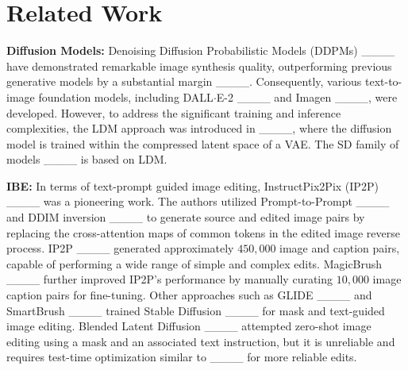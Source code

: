 \section{Related Work}
\label{sec:relatedwork}
\textbf{Diffusion Models:} Denoising Diffusion Probabilistic Models (DDPMs) ____ have demonstrated remarkable image synthesis quality, outperforming previous generative models by a substantial margin ____. Consequently, various text-to-image foundation models, including DALL$\cdot$E-2 ____ and Imagen ____, were developed. However, to address the significant training and inference complexities, the LDM approach was introduced in ____, where the diffusion model is trained within the compressed latent space of a VAE. The SD family of models ____ is based on LDM.

\textbf{IBE:} In terms of text-prompt guided image editing, InstructPix2Pix (IP2P) ____ was a pioneering work. The authors utilized Prompt-to-Prompt ____ and DDIM inversion ____ to generate source and edited image pairs by replacing the cross-attention maps of common tokens in the edited image reverse process. IP2P ____ generated approximately $450,000$ image and caption pairs, capable of performing a wide range of simple and complex edits. MagicBrush ____ further improved IP2P's performance by manually curating $10,000$ image caption pairs for fine-tuning. Other approaches such as GLIDE ____ and SmartBrush ____ trained Stable Diffusion ____ for mask and text-guided image editing. Blended Latent Diffusion ____ attempted zero-shot image editing using a mask and an associated text instruction, but it is unreliable and requires test-time optimization similar to ____ for more reliable edits.